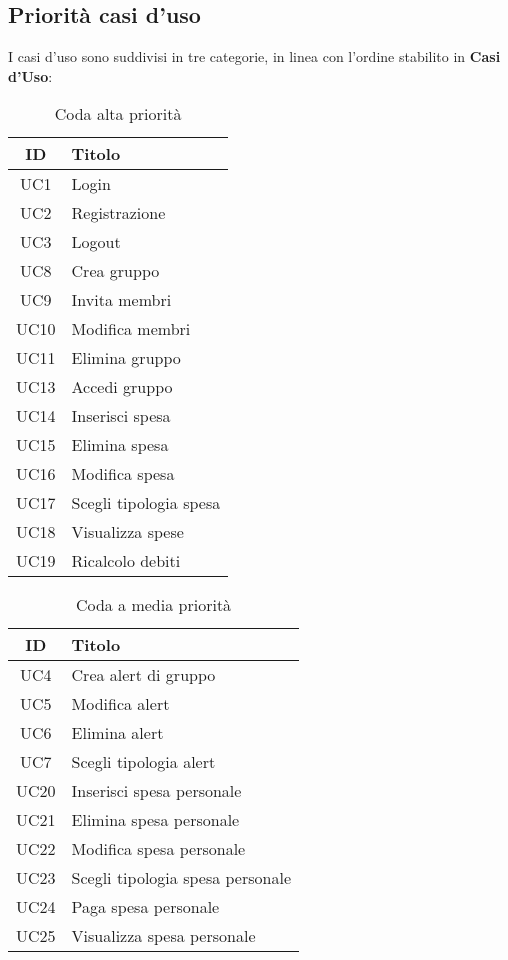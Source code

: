 \subsection{Priorità casi d'uso}
I casi d'uso sono suddivisi in tre categorie, in linea con l'ordine stabilito in \textbf{Casi d'Uso}:

\begin{table}[H]
    \centering
    \begin{tabular}{|c|p{10cm}|}
        \hline
        \textbf{ID} & \textbf{Titolo} \\ \hline
        UC1  & Login \\ \hline
        UC2  & Registrazione \\ \hline
        UC3  & Logout \\ \hline
        UC8  & Crea gruppo \\ \hline
        UC9  & Invita membri \\ \hline
        UC10 & Modifica membri \\ \hline
        UC11 & Elimina gruppo \\ \hline
        UC13 & Accedi gruppo \\ \hline
        UC14 & Inserisci spesa \\ \hline
        UC15 & Elimina spesa \\ \hline
        UC16 & Modifica spesa \\ \hline
        UC17 & Scegli tipologia spesa \\ \hline
        UC18 & Visualizza spese \\ \hline
        UC19 & Ricalcolo debiti \\ \hline
    \end{tabular}
    \caption{Coda alta priorità}
\end{table}

\begin{table}[H]
   \centering
   \begin{tabular}{|c|p{10cm}|}
       \hline
       \textbf{ID} & \textbf{Titolo} \\ \hline
       UC4  & Crea alert di gruppo \\ \hline
       UC5  & Modifica alert \\ \hline
       UC6  & Elimina alert \\ \hline
       UC7  & Scegli tipologia alert \\ \hline
       UC20 & Inserisci spesa personale \\ \hline
       UC21 & Elimina spesa personale \\ \hline
       UC22 & Modifica spesa personale \\ \hline
       UC23 & Scegli tipologia spesa personale \\ \hline
       UC24 & Paga spesa personale \\ \hline
       UC25 & Visualizza spesa personale \\ \hline
   \end{tabular}
   \caption{Coda a media priorità}
\end{table}

